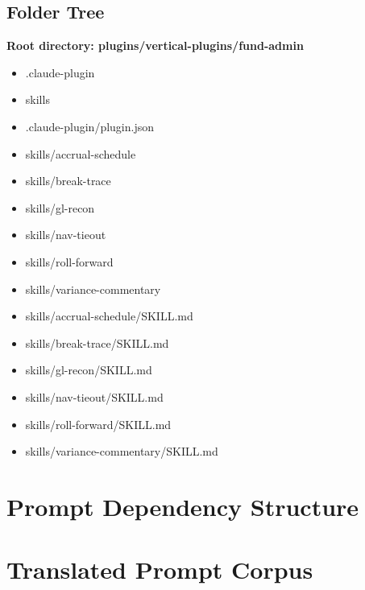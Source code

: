 \documentclass[11pt]{article}
\begin{document}
\subsection{Folder Tree}
\textbf{Root directory: plugins/vertical-plugins/fund-admin}
\begin{itemize}[leftmargin=*,itemsep=1pt,topsep=2pt]
\item \hspace*{0.0em}.claude-plugin
\item \hspace*{0.0em}skills
\item \hspace*{0.9em}.claude-plugin/plugin.json
\item \hspace*{0.9em}skills/accrual-schedule
\item \hspace*{0.9em}skills/break-trace
\item \hspace*{0.9em}skills/gl-recon
\item \hspace*{0.9em}skills/nav-tieout
\item \hspace*{0.9em}skills/roll-forward
\item \hspace*{0.9em}skills/variance-commentary
\item \hspace*{1.8em}skills/accrual-schedule/SKILL.md
\item \hspace*{1.8em}skills/break-trace/SKILL.md
\item \hspace*{1.8em}skills/gl-recon/SKILL.md
\item \hspace*{1.8em}skills/nav-tieout/SKILL.md
\item \hspace*{1.8em}skills/roll-forward/SKILL.md
\item \hspace*{1.8em}skills/variance-commentary/SKILL.md
\end{itemize}

\section{Prompt Dependency Structure}

\newpage

\section{Translated Prompt Corpus}
\end{document}
